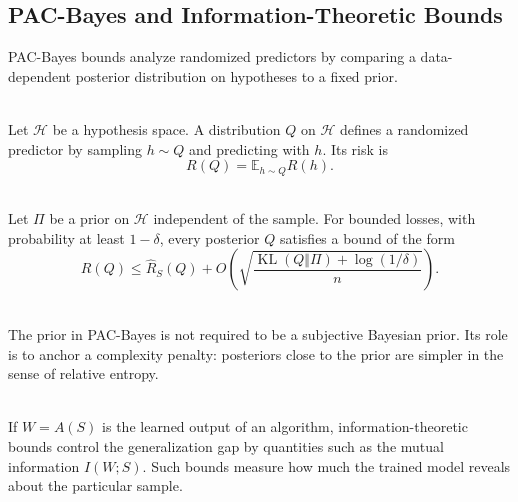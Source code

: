 \subsection{PAC-Bayes and Information-Theoretic Bounds}

PAC-Bayes bounds analyze randomized predictors by comparing a data-dependent posterior distribution on hypotheses to a fixed prior.

\begin{definition} \label{def:sl-randomized-predictor} \\
Let $\mathcal{H}$ be a hypothesis space.  A distribution $Q$ on $\mathcal{H}$ defines a randomized predictor by sampling $h\sim Q$ and predicting with $h$.  Its risk is
\[
R(Q)=\mathbb{E}_{h\sim Q}R(h).
\]
\end{definition}

\begin{theorem} \label{thm:sl-pac-bayes-kl-form} \\
Let $\Pi$ be a prior on $\mathcal{H}$ independent of the sample.  For bounded losses, with probability at least $1-\delta$, every posterior $Q$ satisfies a bound of the form
\[
R(Q)\leq \widehat{R}_S(Q)
+O\!\left(
\sqrt{\frac{\operatorname{KL}(Q\Vert \Pi)+\log(1/\delta)}{n}}
\right).
\]
\end{theorem}

\begin{remark} \label{rem:sl-pac-bayes-prior-posterior} \\
The prior in PAC-Bayes is not required to be a subjective Bayesian prior.  Its role is to anchor a complexity penalty: posteriors close to the prior are simpler in the sense of relative entropy.
\end{remark}

\begin{definition} \label{def:sl-information-generalization-gap} \\
If $W=A(S)$ is the learned output of an algorithm, information-theoretic bounds control the generalization gap by quantities such as the mutual information $I(W;S)$.  Such bounds measure how much the trained model reveals about the particular sample.
\end{definition}
